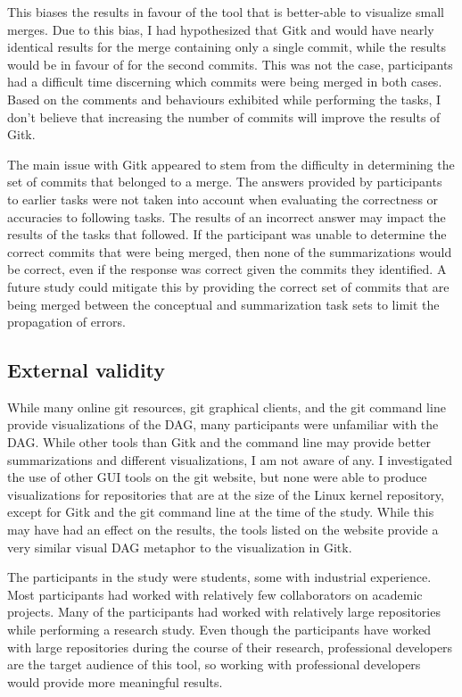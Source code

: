 This biases the results in favour of the tool that is better-able to
visualize small merges.
Due to this bias, I had hypothesized that Gitk and \tool{} would have
nearly identical results for the merge containing only a single commit,
while the results would be in favour of \tool{} for the second commits.
This was not the case, participants had a difficult time discerning
which commits were being merged in both cases.
Based on the comments and behaviours exhibited while performing the
tasks, I don't believe that increasing the number of commits will
improve the results of Gitk.

The main issue with Gitk appeared to stem from the difficulty in
determining the set of commits that belonged to a merge.
The answers provided by participants to earlier tasks were not taken
into account when evaluating the correctness or accuracies to following
tasks. The results of an incorrect answer may impact the results of the
tasks that followed. If the participant was unable to determine the
correct commits that were being merged, then none of the summarizations
would be correct, even if the response was correct given the commits
they identified. A future study could mitigate this by providing the
correct set of commits that are being merged between the conceptual and
summarization task sets to limit the propagation of errors.

\subsection{External validity}\label{sub:external_validity}

While many online git resources, git graphical clients, and the git
command line provide visualizations of the DAG,
many participants were unfamiliar with the DAG.
While other tools than Gitk and the command line may
provide better summarizations and different visualizations, I am not
aware of any. I investigated the use of other GUI tools on the git
website, but none were able to produce visualizations for repositories
that are at the size of the Linux kernel repository, except for Gitk and
the git command line at the time of the study.
While this may have had an effect on the results,
the tools listed on the website provide a very similar visual DAG
metaphor to the visualization in Gitk.

The participants in the study were students, some with industrial
experience. Most participants had worked with relatively few
collaborators on academic projects. Many of the participants had worked
with relatively large repositories while performing a research study.
Even though
the participants have worked with large repositories during the course
of their research, professional developers are the target audience of
this tool, so working with professional developers would provide more
meaningful results.

